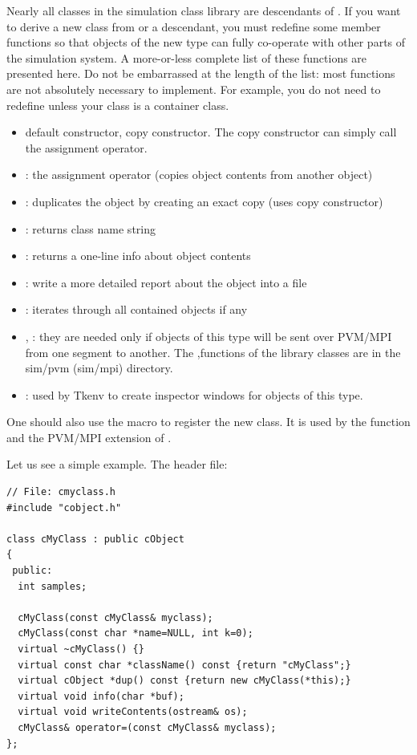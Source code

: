 Nearly all classes in the simulation class library are descendants of
. If you want to derive a new class from
 or a  descendant, you must redefine
some member functions so that objects of the new type can fully
co-operate with other parts of the simulation system. A more-or-less
complete list of these functions are presented here. Do not be
embarrassed at the length of the list: most functions are not
absolutely necessary to implement. For example, you do not need to
redefine  unless your class is a container class.
\begin{itemize}
  \item{default constructor, copy constructor. The copy constructor
    can simply call the assignment operator.}
  \item{: the assignment operator (copies object
    contents from another object)}
  \item{: duplicates the object by creating an exact copy
    (uses copy constructor)}
  \item{: returns class name string}
  \item{: returns a one-line info about object contents}
  \item{: write a more detailed report about the
    object into a file}
  \item{: iterates through all contained objects if
    any}
  \item{, : they are needed only if
    objects of this type will be sent over
    PVM/MPI from one segment to another.  The
    ,functions of the library
    classes are in the sim/pvm (sim/mpi) directory.}
  \item{: used by Tkenv to create
    inspector windows for objects of this type.}
\end{itemize}

One should also use the  macro to register the
new class. It is used by the  function and the
PVM/MPI extension of {\opp}.

Let us see a simple example. The header file:

\begin{Verbatim}
// File: cmyclass.h
#include "cobject.h"

class cMyClass : public cObject
{
 public:
  int samples;

  cMyClass(const cMyClass& myclass);
  cMyClass(const char *name=NULL, int k=0);
  virtual ~cMyClass() {}
  virtual const char *className() const {return "cMyClass";}
  virtual cObject *dup() const {return new cMyClass(*this);}
  virtual void info(char *buf);
  virtual void writeContents(ostream& os);
  cMyClass& operator=(const cMyClass& myclass);
};
\end{Verbatim}

